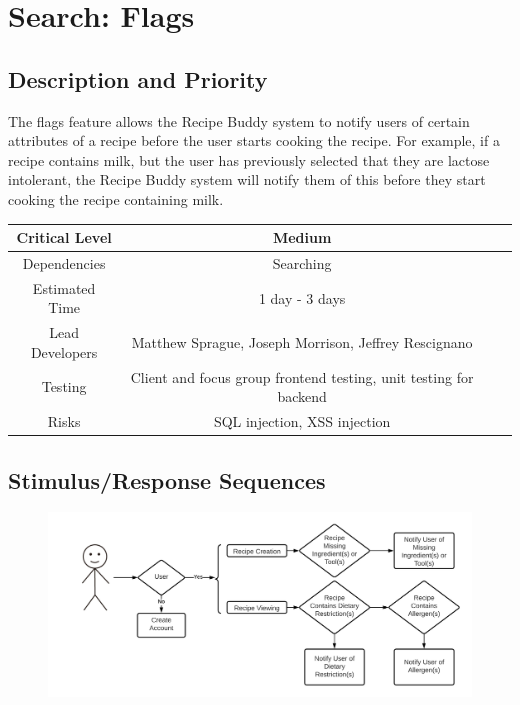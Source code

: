 \documentclass{scrreprt}
\begin{document}
\section{Search: Flags}

\subsection{Description and Priority}

The flags feature allows the \gls{Recipe Buddy} system to notify users of certain attributes of a recipe before the user starts cooking the recipe. For example, if a recipe contains milk, but the user has previously selected that they are lactose intolerant, the \gls{Recipe Buddy} system will notify them of this before they start cooking the recipe containing milk.

\begin{center}
    \begin{tabular}{| c | c | c | c |}
        \hline
        Critical Level  & Medium                                                            \\
        \hline
        Dependencies    & Searching                                                         \\
        \hline
        Estimated Time  & 1 day - 3 days                                                    \\
        \hline
        Lead Developers & Matthew Sprague, Joseph Morrison, Jeffrey Rescignano              \\
        \hline
        Testing         & Client and focus group \gls{frontend} testing,
                          \gls{unit testing} for \gls{backend}                              \\
        \hline
        Risks           & \gls{SQL injection}, \gls{XSS injection}                          \\
        \hline
    \end{tabular}
\end{center}

\subsection{Stimulus/Response Sequences}

\begin{figure}[H]\centering
    \includegraphics[width=\columnwidth]{FlowCharts/Search-Flags.png}
\end{figure}
\end{document}
